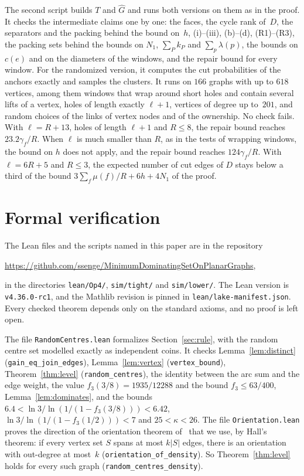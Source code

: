 \documentclass[11pt]{article}
\theoremstyle{remark}
\begin{document}
The second script builds $T$ and $\hat G$ and runs both versions on them as in the proof. It checks
the intermediate claims one by one: the faces, the cycle rank of~$D$, the separators and the packing
behind the bound on~$h$, (i)--(iii), (b)--(d), (R1)--(R3), the packing sets behind the bounds on
$N_1$, $\sum_Pk_P$ and $\sum_p\lambda(p)$, the bounds on $c(e)$ and on the diameters of the windows,
and the repair bound for every window. For the randomized version, it computes the cut probabilities
of the anchors exactly and samples the clusters. It runs on $166$ graphs with up to $618$ vertices,
among them windows that wrap around short holes and contain several lifts of a vertex, holes of
length exactly $\ell+1$, vertices of degree up to~$201$, and random choices of the links of vertex
nodes and of the ownership. No check fails. With $\ell=R+13$, holes of length $\ell+1$ and $R\le8$,
the repair bound reaches $23.2\gamma_f/R$. When $\ell$ is much smaller than $R$, as in the tests of
wrapping windows, the bound on $h$ does not apply, and the repair bound reaches $124\gamma_f/R$. With
$\ell=6R+5$ and $R\le3$, the expected number of cut edges of $D$ stays below a third of the bound
$3\sum_f\mu(f)/R+6h+4N_1$ of the proof.

\section{Formal verification}\label{sec:lean}

The Lean files and the scripts named in this paper are in the repository
\begin{center}
  \url{https://github.com/ssenge/MinimumDominatingSetOnPlanarGraphs},
\end{center}
in the directories \texttt{lean/Op4/}, \texttt{sim/tight/} and \texttt{sim/lower/}. The Lean version is
\texttt{v4.36.0-rc1}, and the Mathlib revision is pinned in \texttt{lean/lake-manifest.json}.
Every checked theorem depends only on the standard axioms, and no proof is left open.

The file \texttt{RandomCentres.lean} formalizes Section~\ref{sec:rule}, with the random centre set
modelled exactly as independent coins. It checks Lemma~\ref{lem:distinct}
(\texttt{gain\_eq\_join\_edges}),
Lemma~\ref{lem:vertex} (\texttt{vertex\_bound}), Theorem~\ref{thm:level} (\texttt{random\_centres}),
the identity between the arc sum and the edge weight, the value
$f_3(3/8)=1935/12288$ and the bound $f_3\le 63/400$, Lemma~\ref{lem:dominates}, and the bounds
$6.4<\ln3/\ln(1/(1-f_3(3/8)))<6.42$, $\ln3/\ln(1/(1-f_3(1/2)))<7$ and $25<\kappa<26$. The file
\texttt{Orientation.lean} proves the direction of the orientation theorem of~\cite{H65} that we use,
by Hall's theorem: if every vertex set $S$ spans at most $k|S|$ edges, there is an orientation with
out-degree at most~$k$ (\texttt{orientation\_of\_density}). So Theorem~\ref{thm:level} holds for
every such graph (\texttt{random\_centres\_density}).
\end{document}
